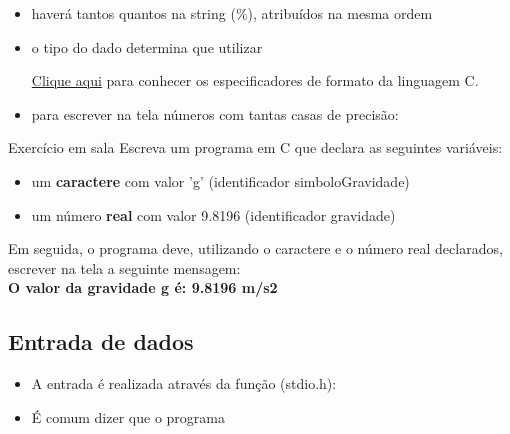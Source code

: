 \documentclass[portuguese,10pt,xcolor=table]{beamer}
\begin{document}
    \begin{frame}
        \begin{itemize}
			\item haverá tantos  quantos  na string (\%), atribuídos na mesma ordem
            
				\vspace{1cm}
		\item o tipo do dado determina que  utilizar
            
				\vspace{1cm}
			\href{https://en.wikipedia.org/wiki/C\_data\_types\#Basic\_types}{\color{blue}Clique aqui} para conhecer os especificadores de formato da linguagem C.
			\item para escrever na tela números com tantas casas de precisão:
            

        \end{itemize}
    \end{frame}

	\begin{frame}
	\begin{alertblock}{Exercício em sala}
	Escreva um programa em C que declara as seguintes variáveis:
	\begin{itemize}
		\item um \textbf{caractere} com valor 'g' (identificador simboloGravidade)
		\item um número \textbf{real} com valor 9.8196 (identificador gravidade)
	\end{itemize}
	
	Em seguida, o programa deve, utilizando o caractere e o número real declarados, escrever na tela a seguinte mensagem:\\
	\textbf{O valor da gravidade g é: 9.8196 m/s2}
	
	\end{alertblock}


	\end{frame}

\subsection{Entrada de dados}
    \begin{frame}
        \begin{itemize}
			\item A entrada é realizada através da função  (stdio.h):
            
            \item É comum dizer que o programa 
        \end{itemize}    
    \end{frame}
\end{document}
